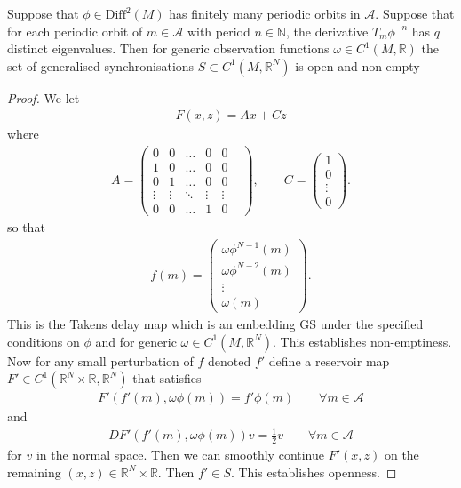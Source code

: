 \documentclass[10pt,a4paper]{amsart}
\begin{document}
\begin{lemma}
\label{lem::open_nonempty}
     Suppose that $\phi \in \mathrm{Diff}^2(M)$ has finitely many periodic orbits in $\mathcal{A}$. Suppose that for each periodic orbit of $m \in \mathcal{A}$ with period $n \in \mathbb{N}$, the derivative $T_m \phi^{-n}$ has $q$ distinct eigenvalues. Then for generic observation functions $\omega \in C^1(M,\mathbb{R})$ the set of generalised synchronisations $S \subset C^1(M,\mathbb{R}^N)$ is open and non-empty
\end{lemma}

\begin{proof}
    We let
    \begin{align*}
        F(x,z) = Ax + Cz
    \end{align*}
    where
    \begin{align*}
        A = 
        \begin{pmatrix}
            0 & 0 & \ldots & 0 & 0 \\
            1 & 0 & \ldots & 0 & 0 \\
            0 & 1 & \ldots & 0 & 0 \\
            \vdots & \vdots & \ddots & \vdots & \vdots & \\
            0 & 0 & \ldots & 1 & 0
        \end{pmatrix},
        \qquad C = 
        \begin{pmatrix}
            1 \\
            0 \\
            \vdots \\
            0
        \end{pmatrix}.
    \end{align*}
    so that
    \begin{align*}
        f(m) = 
        \begin{pmatrix}
            \omega\phi^{N-1}(m) \\
            \omega\phi^{N-2}(m) \\
            \vdots \\
            \omega(m)
        \end{pmatrix}.
    \end{align*}
    This is the Takens delay map which is an embedding GS under the specified conditions on $\phi$ and for generic $\omega \in C^1(M,\mathbb{R}^N)$. This establishes non-emptiness. 
    Now for any small perturbation of $f$ denoted $f'$ define a reservoir map $F' \in C^1(\mathbb{R}^N \times \mathbb{R} , \mathbb{R}^N)$ that satisfies
    \begin{align*}
        F'(f'(m),\omega\phi(m)) = f'\phi(m) \qquad \forall m \in \mathcal{A}
    \end{align*}
    and 
    \begin{align*}
        DF'(f'(m),\omega\phi(m))v = \frac{1}{2} v \qquad \forall m \in \mathcal{A}
    \end{align*}
    for $v$ in the normal space. Then we can smoothly continue $F'(x,z)$ on the remaining $(x,z) \in \mathbb{R}^N \times \mathbb{R}$. Then $f' \in S$. This establishes openness. 
\end{proof}
\end{document}
